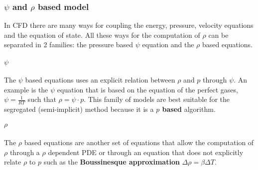 \subsubsection{$\psi$ and $\rho$ based model}
In CFD there are many ways for coupling the energy, pressure, velocity equations and the equation of state. All these ways for the computation of $\rho$ can be separated in 2 families: the pressure based $\psi$ equation and the $\rho$ based equations. 

\paragraph{$\psi$} The $\psi$ based equations uses an explicit relation between $\rho$ and $p$ through $\psi$. An example is the $\psi$ equation that is based on the equation of the perfect gases, $\psi = \frac{1}{R T}$ such that $\rho = \psi \cdot p$. This family of models are best suitable for the segregated (semi-implicit) method because it is a \textbf{$p$ based} algorithm.

\paragraph{$\rho$} The $\rho$ based equations are another set of equations that allow the computation of $\rho$ through a $\rho$ dependent PDE or through an equation that does not explicitly relate $\rho$ to $p$ such as the \textbf{Boussinesque approximation} $\Delta \rho = \beta \Delta T$.
